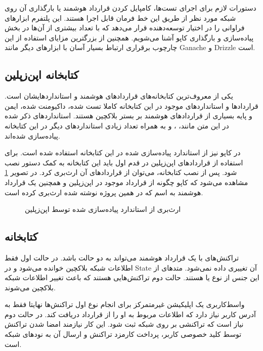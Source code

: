 دستورات لازم برای اجرای تست‌ها،
کامپایل کردن قرارداد هوشمند یا بارگذاری آن روی شبکه مورد نظر از طریق این خط فرمان قابل اجرا هستند.
این پلتفرم ابزارهای فراوانی را در اختیار توسعه‌دهنده قرار می‌دهد
که با تعداد بیشتری از آن‌ها در بخش پیاده‌سازی و بارگذاری کاپو آشنا می‌شویم.
همچنین از بزرگترین مزایای استفاده از این چارچوب برقراری ارتباط بسیار آسان با ابزارهای دیگر مانند
\gls{Ganache}
و
\gls{Drizzle}
است.

\subsection{کتابخانه اپن‌زپلین}
یکی از معروف‌ترین کتابخانه‌های قراردادهای هوشمند و استانداردهایشان است.
قراردادها و استانداردهای موجود در این کتابخانه
کاملا تست شده، داکیومنت شده، ایمن و پایه بسیاری از قراردادهای هوشمند بر بستر بلاکچین هستند.
استانداردهای ذکر شده در این متن مانند،
،
و
به همراه تعداد زیادی استانداردهای دیگر در این کتابخانه پیاده‌سازی شده‌اند.

در کاپو نیز از استاندارد
پیاده‌سازی شده در این کتابخانه استفاده شده است.
برای استفاده از قرارداد‌های اپن‌زپلین در قدم اول باید این کتابخانه به کمک دستور
نصب شود. پس از نصب کتابخانه، می‌توان از قراردادهای آن ارث‌بری کرد.
در تصویر
\ref{fig:inherit-erc721}
مشاهده می‌شود که کاپو چگونه از قرارداد
موجود در اپن‌زپلین و همچنین یک قرارداد هوشمند به اسم
که در همین پروژه نوشته شده ارث‌بری کرده است.

\begin{figure}[H]
\centerline{}
\caption{ارث‌بری از استاندارد  پیاده‌سازی شده توسط اپن‌زپلین}
\label{fig:inherit-erc721}
\end{figure}

\subsection{کتابخانه }
تراکنش‌های با یک قرارداد هوشمند می‌تواند به دو حالت باشد.
در حالت اول فقط اطلاعات شبکه بلاکچین خوانده می‌شود و در
\gls{State}
آن تغییری داده نمی‌شود.
متدهای از این جنس از نوع
یا
هستند. حالت دوم تراکنش‌هایی هستند که باعث تغییر اطلاعات شبکه بلاکچین می‌شوند.

واسط‌کاربری یک اپلیکیشن غیرمتمرکز برای انجام نوع اول تراکنش‌ها
نهایتا فقط به آدرس کاربر نیاز دارد
که اطلاعات مربوط به او را از قرارداد دریافت کند.
در حالت دوم نیاز است که تراکنشی بر روی شبکه ثبت شود.
این کار نیازمند امضا شدن تراکنش توسط کلید خصوصی کاربر،
پرداخت کارمزد تراکنش و ارسال آن به نودهای شبکه است.

